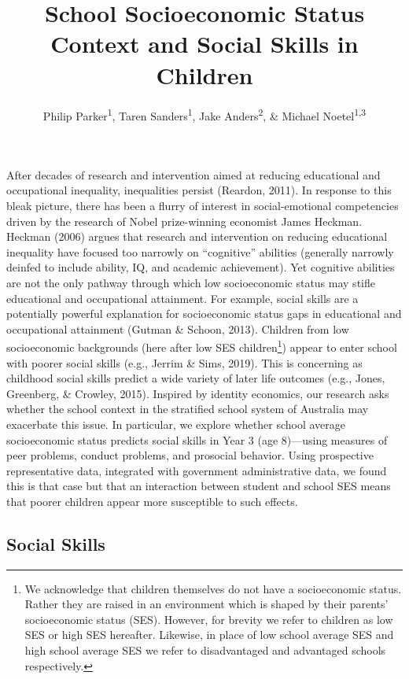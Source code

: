\documentclass[
  english,
  man]{apa6}
\title{School Socioeconomic Status Context and Social Skills in Children}
\author{Philip Parker\textsuperscript{1}, Taren Sanders\textsuperscript{1}, Jake Anders\textsuperscript{2}, \& Michael Noetel\textsuperscript{1,3}}
\date{}
\affiliation{\vspace{0.5cm}\textsuperscript{1} Institute for Positive Psychology and Education, Australian Catholic University\\\textsuperscript{2} UCL Institute of Education, UCL\\\textsuperscript{3} School of Health and Behavioural Sciences, Australian Catholic University}
\begin{document}
\maketitle

After decades of research and intervention aimed at reducing educational and occupational inequality, inequalities persist (Reardon, 2011). In response to this bleak picture, there has been a flurry of interest in social-emotional competencies driven by the research of Nobel prize-winning economist James Heckman. Heckman (2006) argues that research and intervention on reducing educational inequality have focused too narrowly on ``cognitive'' abilities (generally narrowly deinfed to include ability, IQ, and academic achievement). Yet cognitive abilities are not the only pathway through which low socioeconomic status may stifle educational and occupational attainment. For example, social skills are a potentially powerful explanation for socioeconomic status gaps in educational and occupational attainment (Gutman \& Schoon, 2013). Children from low socioeconomic backgrounds (here after low SES children\footnote{We acknowledge that children themselves do not have a socioeconomic status. Rather they are raised in an environment which is shaped by their parents' socioeconomic status (SES). However, for brevity we refer to children as low SES or high SES hereafter. Likewise, in place of low school average SES and high school average SES we refer to disadvantaged and advantaged schools respectively.}) appear to enter school with poorer social skills (e.g., Jerrim \& Sims, 2019). This is concerning as childhood social skills predict a wide variety of later life outcomes (e.g., Jones, Greenberg, \& Crowley, 2015). Inspired by identity economics, our research asks whether the school context in the stratified school system of Australia may exacerbate this issue. In particular, we explore whether school average socioeconomic status predicts social skills in Year 3 (age 8)---using measures of peer problems, conduct problems, and prosocial behavior. Using prospective representative data, integrated with government administrative data, we found this is that case but that an interaction between student and school SES means that poorer children appear more susceptible to such effects.

\hypertarget{social-skills}{%
\subsection{Social Skills}\label{social-skills}}
\end{document}
